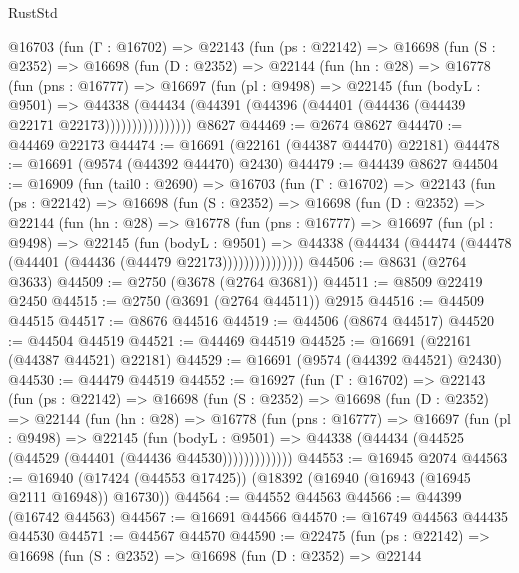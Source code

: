 \begin{lexlean}{RustStd}
\begin{coremodule}
      @16703
        (fun (Γ : @16702) =>
        @22143
          (fun (ps : @22142) =>
          @16698
            (fun (S : @2352) =>
            @16698
              (fun (D : @2352) =>
              @22144
                (fun (hn : @28) =>
                @16778
                  (fun (pns : @16777) =>
                  @16697
                    (fun (pl : @9498) =>
                    @22145
                      (fun (bodyL : @9501) =>
                      @44338
                        (@44434
                          (@44391 (@44396 (@44401 (@44436 (@44439 @22171 @22173))))))))))))))))
    @8627
@44469 := @2674 @8627
@44470 := @44469 @22173
@44474 := @16691 (@22161 (@44387 @44470) @22181)
@44478 := @16691 (@9574 (@44392 @44470) @2430)
@44479 := @44439 @8627
@44504 := @16909
    (fun (tail0 : @2690) =>
    @16703
      (fun (Γ : @16702) =>
      @22143
        (fun (ps : @22142) =>
        @16698
          (fun (S : @2352) =>
          @16698
            (fun (D : @2352) =>
            @22144
              (fun (hn : @28) =>
              @16778
                (fun (pns : @16777) =>
                @16697
                  (fun (pl : @9498) =>
                  @22145
                    (fun (bodyL : @9501) =>
                    @44338 (@44434 (@44474 (@44478 (@44401 (@44436 (@44479 @22173)))))))))))))))
@44506 := @8631 (@2764 @3633)
@44509 := @2750 (@3678 (@2764 @3681))
@44511 := @8509 @22419 @2450
@44515 := @2750 (@3691 (@2764 @44511)) @2915
@44516 := @44509 @44515
@44517 := @8676 @44516
@44519 := @44506 (@8674 @44517)
@44520 := @44504 @44519
@44521 := @44469 @44519
@44525 := @16691 (@22161 (@44387 @44521) @22181)
@44529 := @16691 (@9574 (@44392 @44521) @2430)
@44530 := @44479 @44519
@44552 := @16927
    (fun (Γ : @16702) =>
    @22143
      (fun (ps : @22142) =>
      @16698
        (fun (S : @2352) =>
        @16698
          (fun (D : @2352) =>
          @22144
            (fun (hn : @28) =>
            @16778
              (fun (pns : @16777) =>
              @16697
                (fun (pl : @9498) =>
                @22145
                  (fun (bodyL : @9501) =>
                  @44338 (@44434 (@44525 (@44529 (@44401 (@44436 @44530)))))))))))))
@44553 := @16945 @2074
@44563 := @16940 (@17424 (@44553 @17425)) (@18392 (@16940 (@16943 (@16945 @2111 @16948)) @16730))
@44564 := @44552 @44563
@44566 := @44399 (@16742 @44563)
@44567 := @16691 @44566
@44570 := @16749 @44563 @44435 @44530
@44571 := @44567 @44570
@44590 := @22475
    (fun (ps : @22142) =>
    @16698
      (fun (S : @2352) =>
      @16698
        (fun (D : @2352) =>
        @22144

\end{coremodule}
\end{lexlean}
